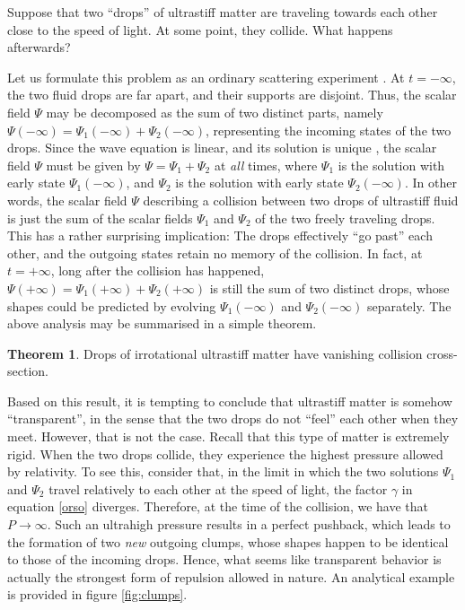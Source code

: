 \documentclass[a4paper, amsfonts, amssymb, amsmath, reprint, showkeys, nofootinbib, twoside,notitlepage,onecolumn]{revtex4-2}
\theoremstyle{definition}
\theoremstyle{theorem}
\newtheorem{theorem}{Theorem}
\theoremstyle{corollary}
\begin{document}
Suppose that two ``drops'' of ultrastiff matter are traveling towards each other close to the speed of light. At some point, they collide. What happens afterwards? 

Let us formulate this problem as an ordinary scattering experiment \cite[Ch 3]{weinbergQFT_1995}. At $t=-\infty$, the two fluid drops are far apart, and their supports are disjoint. Thus, the scalar field $\Psi$ may be decomposed as the sum of two distinct parts, namely $\Psi(-\infty)=\Psi_1(-\infty)+\Psi_2(-\infty)$, representing the incoming states of the two drops. Since the wave equation is linear, and its solution is unique \cite[Theor 10.1.2]{Wald}, the scalar field $\Psi$ must be given by $\Psi=\Psi_1+\Psi_2$ at \textit{all} times, where $\Psi_1$ is the solution with early state $\Psi_1(-\infty)$, and $\Psi_2$ is the solution with early state $\Psi_2(-\infty)$. In other words, the scalar field $\Psi$ describing a collision between two drops of ultrastiff fluid is just the sum of the scalar fields $\Psi_1$ and $\Psi_2$ of the two freely traveling drops. This has a rather surprising implication: The drops effectively ``go past'' each other, and the outgoing states retain no memory of the collision. In fact, at $t=+\infty$, long after the collision has happened, $\Psi(+\infty)=\Psi_1(+\infty)+\Psi_2(+\infty)$
is still the sum of two distinct drops, whose shapes could be predicted by evolving $\Psi_1(-\infty)$ and $\Psi_2(-\infty)$ separately.
The above analysis may be summarised in a simple theorem.
\begin{theorem}\label{theo1}
Drops of irrotational ultrastiff matter have vanishing collision cross-section.   
\end{theorem}
Based on this result, it is tempting to conclude that ultrastiff matter is somehow ``transparent'', in the sense that the two drops do not ``feel'' each other when they meet. However, that is not the case. Recall that this type of matter is extremely rigid. When the two drops collide, they experience the highest pressure allowed by relativity. To see this, consider that, in the limit in which the two solutions $\Psi_1$ and $\Psi_2$ travel relatively to each other at the speed of light, the factor $\gamma$ in equation \eqref{orso} diverges. Therefore, at the time of the collision, we have that $P\rightarrow \infty$. Such an ultrahigh pressure results in a perfect pushback, which leads to the formation of two \textit{new} outgoing clumps, whose shapes happen to be identical to those of the incoming drops. Hence, what seems like transparent behavior is actually the strongest form of repulsion allowed in nature. An analytical example is provided in figure \ref{fig:clumps}.
\end{document}
